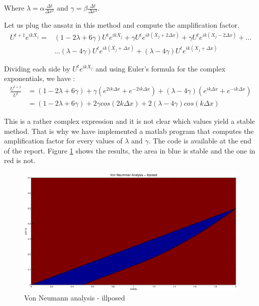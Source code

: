 Where  $\lambda = \alpha\frac{\Delta t}{\Delta x^2}$ and $\gamma = \beta \frac{\Delta t}{\Delta x^4}$.

Let us plug the ansatz in this method and compute the amplification factor.
\begin{align*}
U^{t+1}e^{ikX_j} = &(1-2\lambda+6\gamma)U^{t}e^{ikX_j} + \gamma U^te^{ik(X_j+2\Delta x)}+ \gamma U^te^{ik(X_j-2\Delta x)}+...\\
&...(\lambda - 4\gamma) U^te^{ik(X_j+\Delta x)}+(\lambda - 4\gamma) U^te^{ik(X_j+\Delta x)}
\end{align*}

Dividing each side by $U^{t}e^{ikX_j}$ and using Euler's formula for the complex exponentials, we have :
\begin{align*}
\frac{U^{t+1}}{U^t} &= (1-2\lambda+6\gamma) + \gamma (e^{2ik\Delta x}+e^{-2ik\Delta x})+(\lambda - 4\gamma)(e^{ik\Delta x}+e^{-ik\Delta x})\\
&=(1-2\lambda+6\gamma) + 2\gamma cos(2k\Delta x) + 2(\lambda - 4\gamma)cos(k\Delta x)
\end{align*}

This is a rather complex expression and it is not clear which values yield a stable method. That is why we have implemented a matlab program that computes the amplification factor for every values of $\lambda$ and $\gamma$. The code is available at the end of the report. Figure \ref{reg2} shows the results, the area in blue is stable and the one in red is not.

\begin{figure}
\begin{center}
\includegraphics[scale=0.4]{reg2.eps}
\caption{Von Neumann analysis - illposed}
\label{reg2}
\end{center}
\end{figure}

